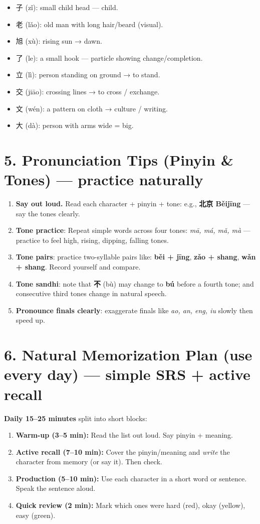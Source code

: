 \begin{CJK}{UTF8}{gbsn}
\begin{itemize}[leftmargin=*]
  \item 子 (zǐ): small child head — child.
  \item 老 (lǎo): old man with long hair/beard (visual).
  \item 旭 (xù): rising sun → dawn.
  \item 了 (le): a small hook — particle showing change/completion.
  \item 立 (lì): person standing on ground → to stand.
  \item 交 (jiāo): crossing lines → to cross / exchange.
  \item 文 (wén): a pattern on cloth → culture / writing.
  \item 大 (dà): person with arms wide = big.
\end{itemize}

\section*{5. Pronunciation Tips (Pinyin \& Tones) — practice naturally}
\begin{enumerate}
  \item \textbf{Say out loud.} Read each character + pinyin + tone: e.g., \textbf{北京 Běijīng} — say the tones clearly.
  \item \textbf{Tone practice}: Repeat simple words across four tones: \textit{mā, má, mǎ, mà} — practice to feel high, rising, dipping, falling tones.
  \item \textbf{Tone pairs}: practice two-syllable pairs like: \textbf{běi + jīng}, \textbf{zǎo + shang}, \textbf{wǎn + shang}. Record yourself and compare.
  \item \textbf{Tone sandhi}: note that \textbf{不} (bù) may change to \textbf{bú} before a fourth tone; and consecutive third tones change in natural speech.
  \item \textbf{Pronounce finals clearly}: exaggerate finals like \textit{ao, an, eng, iu} slowly then speed up.
\end{enumerate}

\section*{6. Natural Memorization Plan (use every day) — simple SRS + active recall}
\textbf{Daily 15--25 minutes} split into short blocks:
\begin{enumerate}
  \item \textbf{Warm-up (3--5 min):} Read the list out loud. Say pinyin + meaning.
  \item \textbf{Active recall (7--10 min):} Cover the pinyin/meaning and \emph{write} the character from memory (or say it). Then check.
  \item \textbf{Production (5--10 min):} Use each character in a short word or sentence. Speak the sentence aloud.
  \item \textbf{Quick review (2 min):} Mark which ones were hard (red), okay (yellow), easy (green).
\end{enumerate}


\end{CJK}
